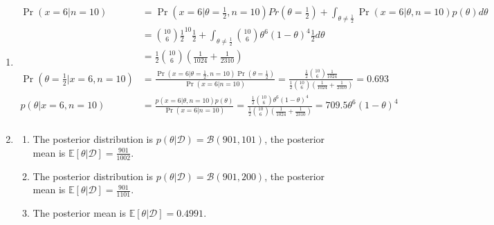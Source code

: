 \documentclass[11pt]{article}
\begin{document}

\begin{enumerate}
    \item $$
    \begin{aligned}
        \Pr(x=6 | n=10) &= \Pr(x=6 |\theta = \frac{1}{2}, n=10) Pr(\theta = \frac{1}{2}) + \int_{\theta \neq \frac{1}{2}} \Pr(x=6 | \theta, n=10) p(\theta) d\theta \\
        &= {10 \choose 6} {\frac{1}{2}}^{10} \frac{1}{2} + \int_{\theta \neq \frac{1}{2}} {10 \choose 6} \theta^6 (1-\theta)^4 \frac{1}{2} d\theta\\
        &= \frac{1}{2} {10 \choose 6} \left(\frac{1}{1024} + \frac{1}{2310}\right)\\
        \Pr(\theta = \frac{1}{2} | x=6, n=10) &= \frac{\Pr(x=6 | \theta = \frac{1}{2}, n=10)\Pr(\theta = \frac{1}{2})}{\Pr(x=6 | n=10)} = \frac{\frac{1}{2} {10 \choose 6} \frac{1}{1024}}{\frac{1}{2} {10 \choose 6} \left(\frac{1}{1024} + \frac{1}{2310}\right)} = 0.693 \\
        p(\theta | x=6, n=10) &= \frac{p(x=6 | \theta, n=10)p(\theta)}{\Pr(x=6 | n=10)} = \frac{\frac{1}{2} {10 \choose 6} \theta^6 (1-\theta)^4}{\frac{1}{2} {10 \choose 6} \left(\frac{1}{1024} + \frac{1}{2310}\right)} = 709.5\theta^6 (1-\theta)^4 \\
    \end{aligned}
    $$

    \item 
    \begin{enumerate}[label=(\alph*)]
        \item The posterior distribution is $p(\theta | \mathcal{D}) = \mathcal{B}(901, 101)$, the posterior mean is $\mathbb{E}[\theta | \mathcal{D}] = \frac{901}{1002}$.
        \item The posterior distribution is $p(\theta | \mathcal{D}) = \mathcal{B}(901, 200)$, the posterior mean is $\mathbb{E}[\theta | \mathcal{D}] = \frac{901}{1101}$.
        \item The posterior mean is $\mathbb{E}[\theta | \mathcal{D}] = 0.4991$.
    \end{enumerate}


\end{enumerate}
\end{document}
